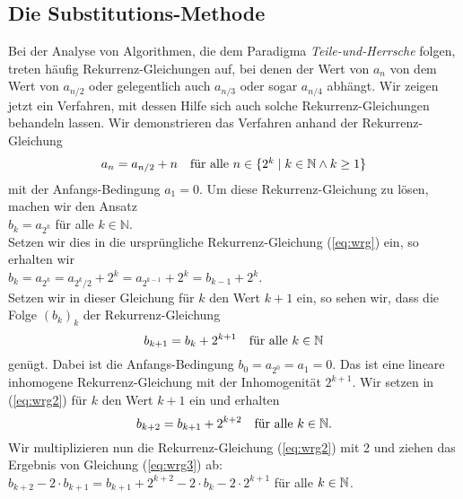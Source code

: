 \subsection{Die Substitutions-Methode}
Bei der Analyse von Algorithmen, die dem Paradigma \emph{Teile-und-Herrsche} folgen,
treten h\"aufig Rekurrenz-Gleichungen auf, bei denen der Wert von $a_n$ von dem Wert von
$a_{n/2}$ oder gelegentlich auch $a_{n/3}$ oder sogar $a_{n/4}$ abh\"angt.  Wir zeigen jetzt
ein Verfahren, mit dessen Hilfe sich auch solche Rekurrenz-Gleichungen behandeln lassen.
Wir demonstrieren das Verfahren anhand der Rekurrenz-Gleichung 
\begin{equation}
  \label{eq:wrg}
a_n = a_{n/2} + n \quad \mbox{f\"ur alle $n \in \{ 2^k \mid k \in {\mathbb N} \wedge k \geq 1\}$}  
\end{equation}
mit der Anfangs-Bedingung $a_1 = 0$.   Um diese Rekurrenz-Gleichung zu l\"osen, machen wir
den Ansatz \\
\hspace*{1.3cm} $b_k = a_{2^k}$ \quad f\"ur alle $k \in \mathbb{N}$. \\[0.1cm]
 Setzen wir dies in die
urspr\"ungliche Rekurrenz-Gleichung (\ref{eq:wrg}) ein, so erhalten wir \\[0.1cm]
\hspace*{1.3cm} 
$b_{k} = a_{2^{k}} = a_{2^{k}/2} + 2^{k} = a_{2^{k-1}} + 2^{k} = b_{k-1}+ 2^{k}$.
\\[0.1cm]
Setzen wir in dieser Gleichung f\"ur $k$ den Wert $k+1$ ein, so sehen wir, dass
die Folge $(b_k)_k$ der Rekurrenz-Gleichung 
\begin{equation}
  \label{eq:wrg2}
  b_{k+1} = b_k + 2^{k+1} \quad \mbox{f\"ur alle $k \in {\mathbb N}$}
\end{equation}
gen\"ugt.  Dabei ist die Anfangs-Bedingung $b_0 = a_{2^0} = a_1 = 0$.  Das ist eine lineare
inhomogene Rekurrenz-Gleichung mit der Inhomogenit\"at $2^{k+1}$. Wir 
setzen in (\ref{eq:wrg2}) f\"ur $k$ den Wert $k+1$
ein und erhalten 
\begin{equation}
  \label{eq:wrg3}
  b_{k+2} = b_{k+1} + 2^{k+2} \quad \mbox{f\"ur alle $k \in {\mathbb N}$.}
\end{equation}
Wir multiplizieren nun die Rekurrenz-Gleichung (\ref{eq:wrg2}) mit 2 und ziehen das Ergebnis
von Gleichung  (\ref{eq:wrg3}) ab: \\[0.1cm]
\hspace*{1.3cm} 
$b_{k+2} - 2 \cdot b_{k+1} = b_{k+1} + 2^{k+2} - 2 \cdot b_k - 2 \cdot 2^{k+1}$ \quad f\"ur alle $k \in {\mathbb N}$. 
\\[0.1cm]
